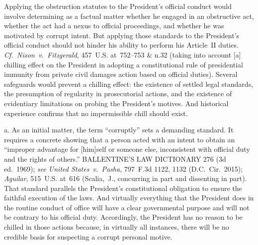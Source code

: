 Applying the obstruction statutes to the President's official conduct would involve determining as a factual matter whether he engaged in an obstructive act, whether the act had a nexus to official proceedings, and whether he was motivated by corrupt intent.
But applying those standards to the President's official conduct should not hinder his ability to perform his Article~II duties.
\textit{Cf.~Nixon~v.\ Fitzgerald}, 457~U.S. at~752--753 \& n.32 (taking into account [a] chilling effect on the President in adopting a constitutional rule of presidential immunity from private civil damages action based on official duties).
Several safeguards would prevent a chilling effect: the existence of settled legal standards, the presumption of regularity in prosecutorial actions, and the existence of evidentiary limitations on probing the President's motives.
And historical experience confirms that no impermissible chill should exist.

a. As an initial matter, the term ``corruptly'' sets a demanding standard.
It requires a concrete showing that a person acted with an intent to obtain an ``improper advantage for [him]self or someone else, inconsistent with official duty and the rights of others.'' BALLENTINE'S LAW DICTIONARY 276 (3d ed.~1969);
\textit{see United States~v.\ Pasha}, 797~F.3d 1122, 1132 (D.C.~Cir.~2015);
\textit{Aguilar}, 515~U.S. at~616 (Scalia,~J., concurring in part and dissenting in part).
That standard parallels the President's constitutional obligation to ensure the faithful execution of the laws.
And virtually everything that the President does in the routine conduct of office will have a clear governmental purpose and will not be contrary to his official duty.
Accordingly, the President has no reason to be chilled in those actions because, in virtually all instances, there will be no credible basis for suspecting a corrupt personal motive.

